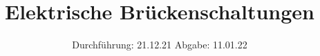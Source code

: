 

\subject{V302}
\title{Elektrische Brückenschaltungen}
\date{
  Durchführung: 21.12.21
  \hspace{3em}
  Abgabe: 11.01.22
}



\maketitle
\thispagestyle{empty}
\tableofcontents
\newpage







\newpage
\printbibliography{}
\nocite{matplotlib}
\nocite{numpy}
\nocite{uncertainties}
\nocite{reback2020pandas}


